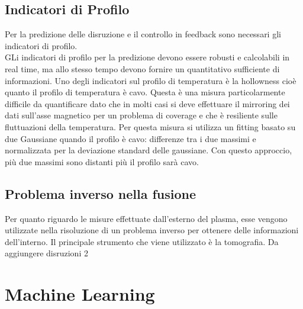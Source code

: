 \documentclass{article}
\begin{document}
\subsection{Indicatori di Profilo}
Per la predizione delle disruzione e il controllo in feedback sono necessari gli indicatori di profilo.\\ GLi indicatori di profilo per la predizione devono essere robusti e calcolabili in real time, ma allo stesso tempo devono fornire  un quantitativo sufficiente di informazioni. Uno degli indicatori sul profilo di temperatura è la hollowness cioè quanto il profilo di temperatura è cavo. Questa è una misura particolarmente difficile da quantificare dato che in molti casi si deve effettuare il mirroring dei dati sull'asse magnetico per un problema di coverage e che è resiliente sulle fluttuazioni della temperatura.\newline
Per questa misura si utilizza un fitting basato su due Gaussiane quando il profilo è cavo: differenze tra i due massimi e normalizzata per la deviazione standard delle  gaussiane. Con questo approccio, più due massimi sono distanti più il profilo sarà cavo.
\subsection{Problema inverso nella fusione}
Per quanto riguardo le misure effettuate dall'esterno del plasma, esse vengono utilizzate nella risoluzione di un problema inverso per ottenere delle informazioni dell'interno. Il principale strumento che viene utilizzato è la tomografia.
Da aggiungere disruzioni 2
\section{Machine Learning}
\end{document}
